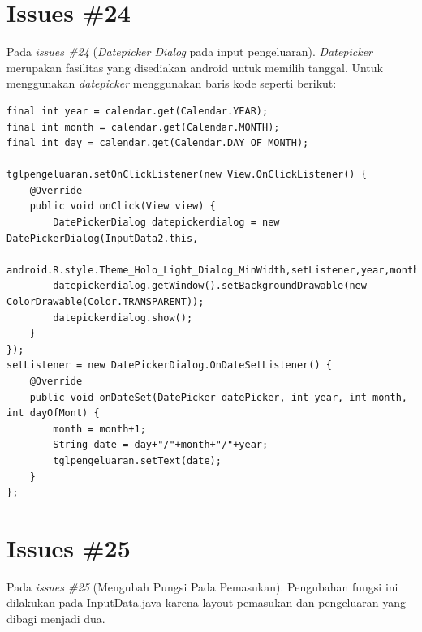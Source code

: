 \section{Issues \#24}
Pada \textit{issues \#24} (\textit{Datepicker Dialog} pada input pengeluaran). \textit{Datepicker} merupakan fasilitas yang disediakan android untuk memilih tanggal. Untuk menggunakan \textit{datepicker} menggunakan baris kode seperti berikut:
\begin{verbatim}
final int year = calendar.get(Calendar.YEAR);
final int month = calendar.get(Calendar.MONTH);
final int day = calendar.get(Calendar.DAY_OF_MONTH);

tglpengeluaran.setOnClickListener(new View.OnClickListener() {
    @Override
    public void onClick(View view) {
        DatePickerDialog datepickerdialog = new DatePickerDialog(InputData2.this,
                android.R.style.Theme_Holo_Light_Dialog_MinWidth,setListener,year,month,day);
        datepickerdialog.getWindow().setBackgroundDrawable(new ColorDrawable(Color.TRANSPARENT));
        datepickerdialog.show();
    }
});
setListener = new DatePickerDialog.OnDateSetListener() {
    @Override
    public void onDateSet(DatePicker datePicker, int year, int month, int dayOfMont) {
        month = month+1;
        String date = day+"/"+month+"/"+year;
        tglpengeluaran.setText(date);
    }
};
\end{verbatim}

\section{Issues \#25}
Pada \textit{issues \#25} (Mengubah Pungsi Pada Pemasukan). Pengubahan fungsi ini dilakukan pada InputData.java karena layout pemasukan dan pengeluaran yang dibagi menjadi dua.

